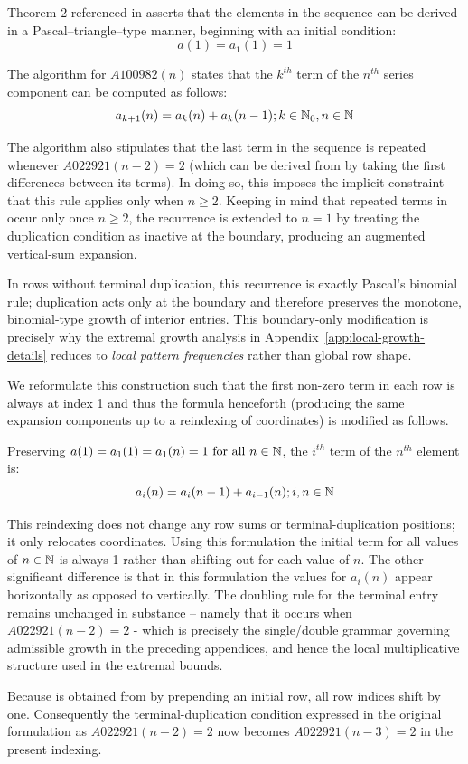 \documentclass[12pt, oneside]{article}
\numberwithin{equation}{section}
\theoremstyle{definition}
\theoremstyle{plain}
\theoremstyle{remark}
\begin{document}
Theorem 2 \cite{Winkler2017} referenced in  asserts that the elements in the
sequence can be derived in a Pascal–triangle–type manner, beginning with an initial condition:
\[
a(1) = a_1(1) = 1
\]

The algorithm for $A100982(n)$ states that the $k^{th}$ term of the $n^{th}$ series component
can be computed as follows:
\[
a_{k+1}(n) = a_k(n) + a_k(n-1); k \in \mathbb{N}_0, n \in \mathbb{N}
\]

The algorithm also stipulates that the last term in the sequence is repeated whenever
$A022921(n-2)=2$ (which can be derived from  by taking the first
differences between its terms).  In doing so, this imposes the implicit constraint that this rule
applies only when $n \ge 2$.  Keeping in mind that repeated terms in 
occur only once $n \ge 2$, the recurrence is extended to $n=1$ by treating the duplication
condition as inactive at the boundary, producing an augmented vertical-sum expansion.

In rows without terminal duplication, this recurrence is exactly Pascal’s binomial rule; duplication acts
only at the boundary and therefore preserves the monotone, binomial-type growth of interior entries.
This boundary-only modification is precisely why the extremal growth analysis in
Appendix~\ref{app:local-growth-details} reduces to \emph{local pattern frequencies}
rather than global row shape.

We reformulate this construction such that the first non-zero term in
each row is always at index 1 and thus the formula henceforth (producing the same expansion
components up to a reindexing of coordinates) is modified as follows.

Preserving $a(1) = a_1(1) = a_1(n) = 1 \text{ for all } n\in\mathbb{N}$, the $i^{th}$ term of the
$n^{th}$  element is:
\[
a_{i}(n) = a_i(n-1) + a_{i-1}(n); i,n \in \mathbb{N}
\]

This reindexing does not change any row sums or terminal-duplication positions; it only relocates coordinates.
Using this formulation the initial term for all values of $n \in \mathbb{N}$ is always 1 rather than
shifting out for each value of $n$.  The other significant difference is that in this formulation
the values for $a_i(n)$ appear horizontally as opposed to vertically.  The doubling rule for the
terminal entry remains unchanged in substance – namely that it occurs when $A022921(n-2) = 2$ -
which is precisely the single/double grammar governing admissible growth in the preceding appendices,
and hence the local multiplicative structure used in the extremal bounds.

Because  is obtained from  by prepending an initial row, all row indices
shift by one.  Consequently the terminal-duplication condition expressed in the original
formulation as $A022921(n-2)=2$ now becomes $A022921(n-3)=2$ in the present indexing.


\clearpage


\end{document}
